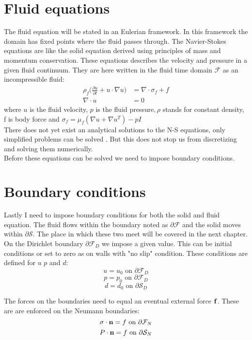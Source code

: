 
\section{Fluid equations}
The fluid equation will be stated in an Eulerian framework. In this framework the domain has fixed points where the fluid passes through. 
The Navier-Stokes equations are like the solid equation derived using principles of mass and momentum conservation. These equations describes the velocity and pressure in a given fluid continuum. They are here written in the fluid time domain $\mathcal{F}$ as an incompressible fluid:
\begin{align}
\label{eq:NS}
\rho_f\big( \frac{\partial u}{\partial t} +  u \cdot \nabla u\big) &= \nabla \cdot \sigma_f + f  \\
\nabla \cdot u &= 0
\end{align}
where $u$ is the fluid velocity, $p$ is the fluid pressure$, \rho$ stands for constant density, f is body force and $ \sigma_f = \mu_f (\nabla u + \nabla u^T)  - pI$ \\
There does not yet exist an analytical solutions to the N-S equations, only simplified problems can be solved \cite{White2000}. But this does not stop us from discretizing and solving them numerically. \\
Before these equations can be solved we need to impose boundary conditions.
\section{Boundary conditions}
Lastly I need to impose boundary conditions for both the solid and fluid equation. The fluid flows within the boundary noted as $ \partial \mathcal{F}$ and the solid moves within $ \partial \mathcal{S}$. The place in which these two meet will be covered in the next chapter. On the Dirichlet boundary $ \partial \mathcal{F}_D$ we impose a given value. This can be initial conditions or set to zero as on walls with "no slip" condition. These conditions are defined for $u$ $p$ and $d$:
$$  u = u_0 \text{   on   } \partial \mathcal{F}_D  $$
$$  p = p_0 \text{   on   } \partial \mathcal{F}_D  $$
$$  d = d_0 \text{   on   } \partial \mathcal{S}_D  $$

The forces on the boundaries need to equal an eventual external force $ \bold{f}$. These are are enforced on the Neumann boundaries:
$$ \sigma \cdot \bold{n} = f \text{   on   } \partial \mathcal{F}_N    $$
$$ P\cdot \bold{n} = f \text{   on   } \partial \mathcal{S}_N    $$







